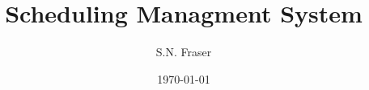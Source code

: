 \documentclass[12pt,a4paper]{article}
\begin{document}
\setlength{\parindent}{5mm}
\setlength{\parskip}{10pt plus2mm minus2mm}
\thispagestyle{empty}

\title{Scheduling Managment System}
\author{S.N. Fraser}
\date{\today}
\maketitle

% 

\newpage
\tableofcontents
\newpage
\listoffigures
\newpage
\listoftables
\newpage
\listofalgorithms
\newpage









\newpage


\end{document}
